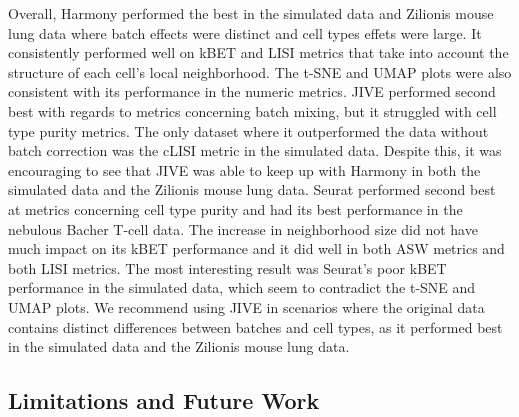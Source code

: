 \documentclass[unnumsec,webpdf,contemporary,large]{oup-authoring-template}%
\theoremstyle{thmstyleone}%
\theoremstyle{thmstyletwo}%
\theoremstyle{thmstylethree}%
\begin{document}
Overall, Harmony performed the best in the simulated data and Zilionis mouse lung data where batch effects were distinct and cell types effets were large. It consistently performed well on kBET and LISI metrics that take into account the structure of each cell's local neighborhood. The t-SNE and UMAP plots were also consistent with its performance in the numeric metrics. JIVE performed second best with regards to metrics concerning batch mixing, but it struggled with cell type purity metrics. The only dataset where it outperformed the data without batch correction was the cLISI metric in the simulated data. Despite this, it was encouraging to see that JIVE was able to keep up with Harmony in both the simulated data and the Zilionis mouse lung data. Seurat performed second best at metrics concerning cell type purity and had its best performance in the nebulous Bacher T-cell data. The increase in neighborhood size did not have much impact on its kBET performance and it did well in both ASW metrics and both LISI metrics. The most interesting result was Seurat's poor kBET performance in the simulated data, which seem to contradict the t-SNE and UMAP plots.
We recommend using JIVE in scenarios where the original data contains distinct differences between batches and cell types, as it performed best in the simulated data and the Zilionis mouse lung data.

\subsection{Limitations and Future Work}
\end{document}
